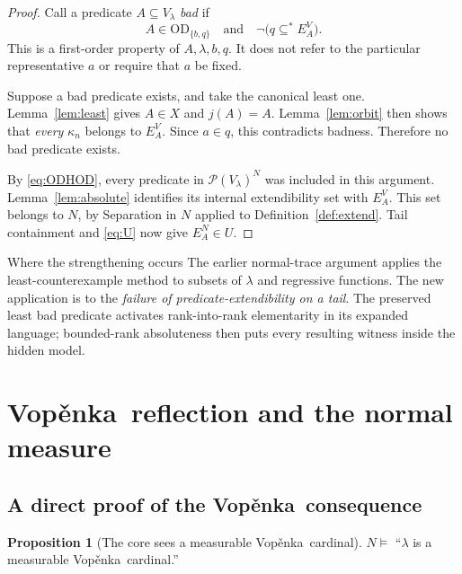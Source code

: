 \documentclass[11pt,letterpaper]{article}
\theoremstyle{definition}
\newtheorem{proposition}[definition]{Proposition}
\numberwithin{equation}{section}
\newcommand{\OD}{\mathrm{OD}}
\newcommand{\Pow}{\mathcal P}
\newcommand{\Vop}{Vop\v{e}nka}
\newcommand{\substar}{\subseteq^{*}}
\begin{document}
\begin{proof}
Call a predicate $A\subseteq V_\lambda$ \emph{bad} if
\[
 A\in\OD_{\{b,q\}}\quad\text{and}\quad
 \neg\bigl(q\substar E_A^V\bigr).
\]
This is a first-order property of $A,\lambda,b,q$. It does not refer to the particular representative $a$ or require that $a$ be fixed.

Suppose a bad predicate exists, and take the canonical least one. Lemma~\ref{lem:least} gives $A\in X$ and $j(A)=A$. Lemma~\ref{lem:orbit} then shows that \emph{every} $\kappa_n$ belongs to $E_A^V$. Since $a\in q$, this contradicts badness. Therefore no bad predicate exists.

By \eqref{eq:ODHOD}, every predicate in $\Pow(V_\lambda)^N$ was included in this argument. Lemma~\ref{lem:absolute} identifies its internal extendibility set with $E_A^V$. This set belongs to $N$, by Separation in $N$ applied to Definition~\ref{def:extend}. Tail containment and \eqref{eq:U} now give $E_A^N\in U$.
\end{proof}

\begin{assessment}{Where the strengthening occurs}
The earlier normal-trace argument applies the least-counterexample method to subsets of $\lambda$ and regressive functions. The new application is to the \emph{failure of predicate-extendibility on a tail}. The preserved least bad predicate activates rank-into-rank elementarity in its expanded language; bounded-rank absoluteness then puts every resulting witness inside the hidden model.
\end{assessment}

\section{\Vop\ reflection and the normal measure}\label{sec:filter}

\subsection{A direct proof of the \Vop\ consequence}

\begin{proposition}[The core sees a measurable \Vop\ cardinal]\label{prop:VP}
$N\models$ ``$\lambda$ is a measurable \Vop\ cardinal.''
\end{proposition}
\end{document}
